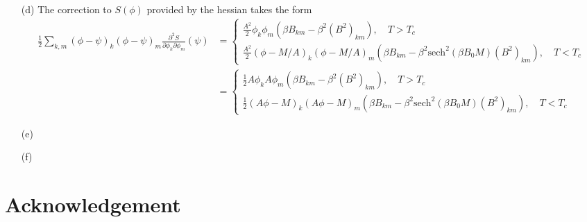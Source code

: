 \documentclass[10pt, a4paper]{article}
\begin{document}
{\begin{enumerate}
\begin{align*}
  \end{align*} 
  \item[(d)] The correction to $S(\phi)$ provided by the hessian takes the form 
  \begin{align*}
    \frac{1}{2} \sum_{k, m}(\phi-\psi)_k(\phi-\psi)_m \frac{\partial^2 S}{\partial \phi_k \partial \phi_m}(\psi) &=  
    \begin{cases}
      \frac{A^2}{2} \phi_k \phi_m (\beta B_{km}-\beta^2 (B^2)_{k m}), \quad T > T_c \\
      \frac{A^2}{2}  (\phi-M/A)_k(\phi-M/A)_m (\beta B_{km}-\beta^2 \text{sech}^2 \left(\beta B_0 M\right)(B^2)_{k m}), \quad T < T_c
    \end{cases}\\
    &=
    \begin{cases}
      \frac{1}{2} A\phi_k A\phi_m (\beta B_{km}-\beta^2 (B^2)_{k m}), \quad T > T_c \\
      \frac{1}{2}  (A\phi-M)_k(A\phi-M)_m (\beta B_{km}-\beta^2 \text{sech}^2 \left(\beta B_0 M\right)(B^2)_{k m}), \quad T < T_c
    \end{cases}
  \end{align*}
  \item[(e)]
  \item[(f)]
\end{enumerate}

\section{Acknowledgement}

}

\makereferences


\end{document}
